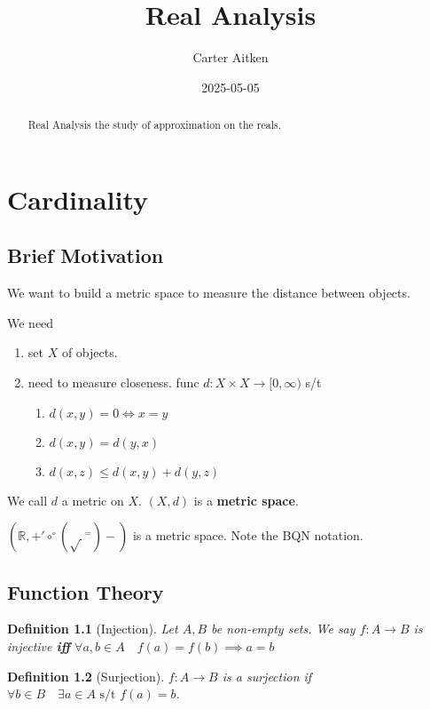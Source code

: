 \documentclass[12pt]{report}
\title{Real Analysis}
\author{Carter Aitken}
\date{2025-05-05}
\theoremstyle{theoremdd}
\newtheorem{defn}{Definition}[section]
\newcommand{\bbox}{\begin{tcolorbox}[colback=blue!20!white,colframe=blue]}
\newcommand{\bboxex}{\begin{tcolorbox}[colback=red!20!white,colframe=red]}
\newcommand{\ebox}{\end{tcolorbox}}
\newcommand{\R}{\mathbb R}
\newcommand{\T}[1]{\text{#1}}
\newcommand{\TB}[1]{\textbf{#1}}
\newcommand{\st}{\T{ s/t }}
\begin{document}
\maketitle 

\begin{abstract}
  Real Analysis the study of approximation on the reals.
\end{abstract}

\tableofcontents

\pagebreak

\chapter{Cardinality}
\section{Brief Motivation}
We want to build a metric space to measure the distance between objects.

We need
\begin{enumerate}
  \item set $X$ of objects.
  \item need to measure closeness. func \(d:X\times X\to[0,\infty)\) s/t
    \begin{enumerate}
      \item \(d(x,y)=0\iff x=y\)
      \item \(d(x,y)=d(y,x)\)
      \item \(d(x,z)\le d(x,y)+d(y,z)\)
    \end{enumerate}
\end{enumerate}

We call \(d\) a metric on \(X\). \((X,d)\) is a \TB{metric space}.
\bboxex
\((\R,+'\circ^\circ(\sqrt{\,}^=)-)\) is a metric space. Note the BQN notation.
\ebox

\section{Function Theory}
\bbox
\begin{defn}[Injection]
  Let \(A,B\) be non-empty sets. We say \(f:A\to B\) is injective \TB{iff}
  \(\forall a,b\in A\quad f(a)=f(b)\implies a=b\)
\end{defn}
\ebox

\bbox
\begin{defn}[Surjection]
  \(f:A\to B\) is a surjection if \(\forall b\in B\quad\exists a\in A\st f(a)
  = b\).
\end{defn}
\ebox
\end{document}

